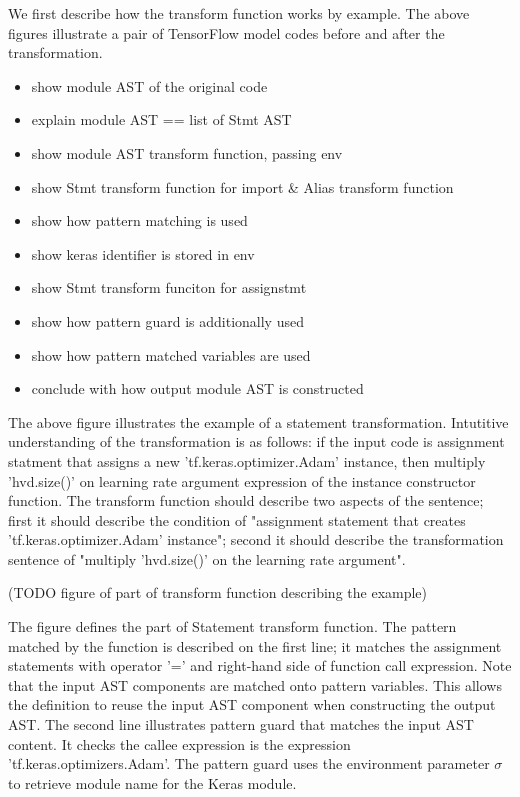 We first describe how the transform function works by example.
The above figures illustrate a pair of TensorFlow model codes
before and after the transformation.


\begin{itemize}
  \item show module AST of the original code
  \item explain module AST == list of Stmt AST
  \item show module AST transform function, passing env
  \item show Stmt transform function for import \& Alias transform function
  \item show how pattern matching is used
  \item show keras identifier is stored in env
  \item show Stmt transform funciton for assignstmt
  \item show how pattern guard is additionally used
  \item show how pattern matched variables are used
  \item conclude with how output module AST is constructed
\end{itemize}

The above figure illustrates the example of a statement transformation.
Intutitive understanding of the transformation is as follows:
if the input code is assignment statment 
that assigns a new 'tf.keras.optimizer.Adam' instance,
then multiply 'hvd.size()' on learning rate argument expression of the
instance constructor function.
The transform function should describe two aspects of the sentence;
first it should describe the condition of "assignment statement that
creates 'tf.keras.optimizer.Adam' instance";
second it should describe the transformation sentence
of "multiply 'hvd.size()' on the learning rate argument". 

(TODO figure of part of transform function describing the example) 

The figure defines the part of Statement transform function. 
The pattern matched by the function is described on the first line;
it matches the assignment statements with operator '=' and
right-hand side of function call expression.
Note that the input AST components are matched onto pattern variables.
This allows the definition to reuse the input AST component
when constructing the output AST.
The second line illustrates pattern guard that matches the input AST content.
It checks the callee expression is the expression 'tf.keras.optimizers.Adam'.
The pattern guard uses the environment parameter $\sigma$ to retrieve
module name for the Keras module.

